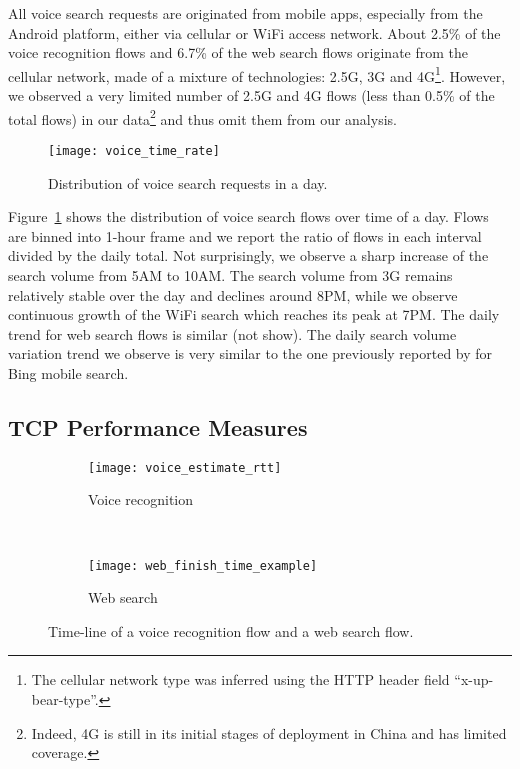 All voice search requests are originated from mobile apps, especially from the Android platform, either via cellular or WiFi access network. About 2.5\% of the voice recognition flows and 6.7\% of the web search flows originate from the cellular network, made of a mixture of technologies: 2.5G, 3G and 4G\footnote{The cellular network type was inferred using the HTTP header field ``x-up-bear-type''.}. However, we observed a very limited number of 2.5G and 4G flows (less than 0.5\% of the total flows) in our data\footnote{Indeed, 4G is still in its initial stages of deployment in China and has limited coverage.} and thus omit them from our analysis.

\begin{figure}[t]
\centering
\texttt{[image: voice\_time\_rate]}
\caption{Distribution of voice search requests in a day.}
\label{fig:voice_time_rate}
\minsqueeze
\end{figure}

Figure~\ref{fig:voice_time_rate} shows the distribution of voice search flows over time of a day. Flows are binned into 1-hour frame and we report the ratio of flows in each interval divided by the daily total. Not surprisingly, we observe a sharp increase of the search volume from 5AM to 10AM. The search volume from 3G remains relatively stable over the day and declines around 8PM, while we observe continuous growth of the WiFi search which reaches its peak at 7PM. The daily trend for web search flows is similar (not show). The daily search volume variation trend we observe is very similar to the one previously reported by \cite{Song:2013:EEU:2488388.2488493} for Bing mobile search.

\subsection{TCP Performance Measures}

\begin{figure}[ht]
\centering
\begin{subfigure}[b]{0.6\linewidth}
	\texttt{[image: voice\_estimate\_rtt]}
\caption{Voice recognition}
\label{fig:voice_estimate_rtt}
\end{subfigure} \\
\begin{subfigure}[b]{0.6\linewidth}
	\texttt{[image: web\_finish\_time\_example]}
\caption{Web search}
\label{fig:web_finish_time_example}
\end{subfigure}
\caption{Time-line of a voice recognition flow and a web search flow.}
\label{fig:time_line}
\minsqueeze
\end{figure}

